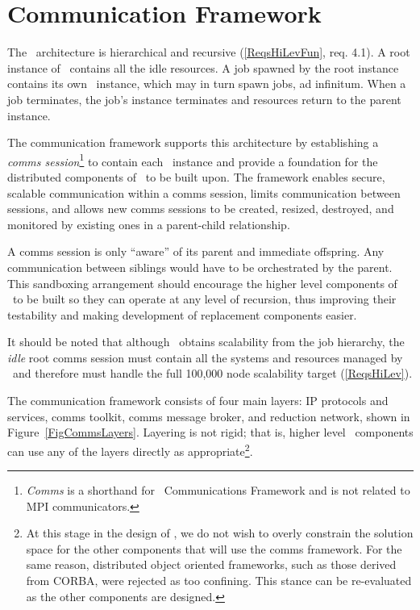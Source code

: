 \section{Communication Framework}
\label{sect:comms}

The \ngrm\ architecture is hierarchical and recursive
(\ref{ReqsHiLevFun}, req. 4.1).
A root instance of \ngrm\ contains all the
idle resources.  A job spawned by the root instance contains
its own \ngrm\ instance, which may in turn spawn jobs, ad infinitum.
When a job terminates, the job's instance terminates and resources
return to the parent instance.

The communication framework supports this architecture by
establishing a {\em comms session}\footnote{{\em Comms} is a shorthand
for \ngrm\ Communications Framework and is not related to MPI communicators.}
to contain each \ngrm\ instance
and provide a foundation for the distributed components of \ngrm\ to
be built upon.
The framework enables secure, scalable communication
within a comms session, limits communication between sessions,
and allows new comms sessions to be created, resized, destroyed,
and monitored by existing ones in a parent-child relationship.
\ifcomments
{}
\fi

A comms session is only ``aware'' of its parent and immediate offspring.
Any communication between siblings would have to be orchestrated by
the parent.  This sandboxing arrangement should encourage the higher level
components of \ngrm\ 
to be built so they can operate at any level of recursion, thus improving
their testability and making development of replacement components easier.

It should be noted that although \ngrm\ obtains scalability from the job
hierarchy, the {\em idle} root comms session must contain all the systems and
resources managed by \ngrm\ and therefore must handle the full 100,000 node
scalability target (\ref{ReqsHiLev}).

The communication framework consists of four main layers:
IP protocols and services, comms toolkit, comms message broker, and
reduction network, shown
in Figure~\ref{FigCommsLayers}.  Layering is not rigid;
that is, higher level \ngrm\ components can use any of the
layers directly as appropriate\footnote{At this stage in the design of \ngrm,
we do not wish to overly constrain the solution space for the other
components that will use the comms framework.  For the same reason,
distributed object oriented frameworks, such as those derived from
CORBA, were rejected as too confining.  This stance can be re-evaluated
as the other components are designed.}.

